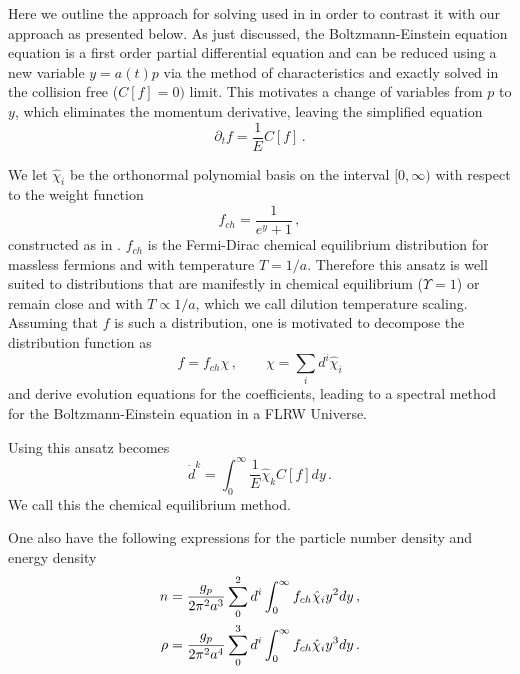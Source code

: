 Here we outline the approach for solving  used in
 \cite{Esposito:2000hi,Mangano:2001iu} in order to contrast it with our approach as presented below.  As just discussed, the Boltzmann-Einstein equation equation  is a first order partial differential equation and can be reduced using a new variable $y=a(t)p$  via the method of characteristics and exactly solved in the collision free ($C[f]=0)$ limit.   This motivates a change of variables from $p$ to $y$, which eliminates the momentum derivative, leaving the simplified equation
\begin{equation}\label{aVars}
\partial_tf=\frac{1}{E} C[f]\,.
\end{equation}

We let $\hat\chi_i$ be the orthonormal polynomial basis on the interval $[0,\infty)$ with respect to the weight function
\begin{equation}\label{freeStreamWeight}
f_{ch}=\frac{1}{e^y+1}\,,
\end{equation}
constructed as in  . $f_{ch}$ is the Fermi-Dirac chemical equilibrium distribution for massless fermions and with temperature $T=1/a$.  Therefore this ansatz is well suited to distributions that are manifestly in chemical equilibrium ($\Upsilon=1$) or remain close and with $T\propto 1/a$, which we call dilution temperature scaling.  Assuming that $f$ is such a distribution, one is   motivated to decompose the distribution function as
\begin{equation}\label{freeStreamAnsatz}
f=f_{ch}\chi\,,\qquad \chi=\sum_i d^i\hat\chi_i
\end{equation}
and derive evolution equations for the coefficients, leading to a spectral method for the Boltzmann-Einstein equation in a FLRW Universe.

Using this ansatz  becomes
\begin{equation}\label{eq:ChemEquilibMethod}
\dot{d}^k=\int_0^\infty\frac{1}{E}\hat{\chi}_k C[f]dy\,.
\end{equation}
We call this the chemical equilibrium method.

One also have the following expressions for the particle number density and energy density
\begin{align}\label{freeStreamMoments}
n&=\frac{g_p}{2\pi^2 a^3}\sum_0^2 d^i\int_0^\infty f_{ch}\hat\chi_i y^2dy\,,\\
\rho&=\frac{g_p}{2\pi^2a^4}\sum_0^3 d^i\int_0^\infty f_{ch}\hat\chi_i y^3dy\,.\notag
\end{align}

